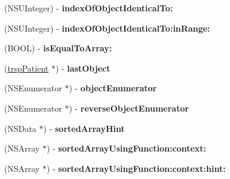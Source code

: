 \begin{DoxyCompactItemize}
\item 
\hypertarget{interfaceget_patients_response_aeca8edbdb57ea315f1a75dae34402b48}{}(N\+S\+U\+Integer) -\/ {\bfseries index\+Of\+Object\+Identical\+To\+:}\label{interfaceget_patients_response_aeca8edbdb57ea315f1a75dae34402b48}

\item 
\hypertarget{interfaceget_patients_response_a1e022e7727adffb20e798485357a5e2b}{}(N\+S\+U\+Integer) -\/ {\bfseries index\+Of\+Object\+Identical\+To\+:in\+Range\+:}\label{interfaceget_patients_response_a1e022e7727adffb20e798485357a5e2b}

\item 
\hypertarget{interfaceget_patients_response_a359a3522b707e5102d50df93f030179c}{}(B\+O\+O\+L) -\/ {\bfseries is\+Equal\+To\+Array\+:}\label{interfaceget_patients_response_a359a3522b707e5102d50df93f030179c}

\item 
\hypertarget{interfaceget_patients_response_a39e2682a3d5e79cc0f5bc6fbcfc9a62a}{}(\hyperlink{interfacetrsp_patient}{trsp\+Patient} $\ast$) -\/ {\bfseries last\+Object}\label{interfaceget_patients_response_a39e2682a3d5e79cc0f5bc6fbcfc9a62a}

\item 
\hypertarget{interfaceget_patients_response_ae5532cc6bc71394c390983fd28913b98}{}(N\+S\+Enumerator $\ast$) -\/ {\bfseries object\+Enumerator}\label{interfaceget_patients_response_ae5532cc6bc71394c390983fd28913b98}

\item 
\hypertarget{interfaceget_patients_response_aef013c9d86d965b0ab63bff29a590765}{}(N\+S\+Enumerator $\ast$) -\/ {\bfseries reverse\+Object\+Enumerator}\label{interfaceget_patients_response_aef013c9d86d965b0ab63bff29a590765}

\item 
\hypertarget{interfaceget_patients_response_ab0ad0c5ef7c8af58eed92f748f95034f}{}(N\+S\+Data $\ast$) -\/ {\bfseries sorted\+Array\+Hint}\label{interfaceget_patients_response_ab0ad0c5ef7c8af58eed92f748f95034f}

\item 
\hypertarget{interfaceget_patients_response_adc17b55361a17556010fc32e7688380a}{}(N\+S\+Array $\ast$) -\/ {\bfseries sorted\+Array\+Using\+Function\+:context\+:}\label{interfaceget_patients_response_adc17b55361a17556010fc32e7688380a}

\item 
\hypertarget{interfaceget_patients_response_aae5429275829fa9a1211a8c56b9a9625}{}(N\+S\+Array $\ast$) -\/ {\bfseries sorted\+Array\+Using\+Function\+:context\+:hint\+:}\label{interfaceget_patients_response_aae5429275829fa9a1211a8c56b9a9625}


\end{DoxyCompactItemize}
